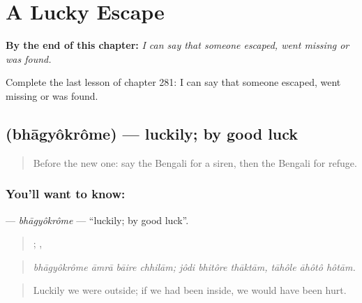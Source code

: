 
\chapter{A Lucky Escape}
\label{ch:bn-a-lucky-escape}

\begin{chapteropening}
\textbf{By the end of this chapter:} \emph{I can say that someone escaped, went missing or was found.}

Complete the last lesson of chapter 281: I can say that someone escaped, went missing or was found.
\end{chapteropening}

\section[\texorpdfstring{\bn{ভাগ্যক্রমে} (bhāgyôkrôme)}{ভাগ্যক্রমে (bhāgyôkrôme)}]{ (bhāgyôkrôme) — luckily; by good luck}

\label{lesson:BN-C281-bhagyokrome}



\begin{quote}
Before the new one: say the Bengali for a siren, then the Bengali for refuge.
\end{quote}

\subsection*{You'll want to know: }
\textbf{} — \emph{bhāgyôkrôme} — \textquotedblleft{}luckily; by good luck\textquotedblright{}.

\begin{quote}
   ;   ,   
\end{quote}

\begin{quote}
\emph{bhāgyôkrôme āmrā bāire chhilām; jôdi bhitôre thāktām, tāhôle āhôtô hôtām.}
\end{quote}

\begin{quote}
Luckily we were outside; if we had been inside, we would have been hurt.
\end{quote}

